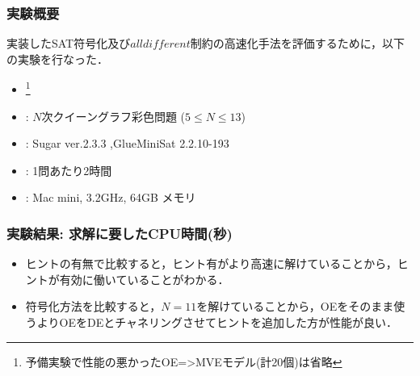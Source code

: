 \documentclass [dvipdfmx,11pt]{beamer}
\newcommand{\alldifferent}{$alldifferent$}
\begin{document}
\begin{frame}
    \frametitle{実験概要}
    実装したSAT符号化及び{\alldifferent}制約の高速化手法を評価するために，以下の実験を行なった．
    \begin{itemize}
        \item {}\footnote{予備実験で性能の悪かったOE={\textgreater}MVEモデル(計20個)は省略}\\
            \vspace{-3mm}
            \begin{block}{}\centering
                {\tiny }
            \end{block}
        \item {}: $N$次クイーングラフ彩色問題 ($5\leq N\leq 13$)
        \item {}: Sugar ver.2.3.3 ,GlueMiniSat 2.2.10-193
        \item {}: 1問あたり2時間
        \item {}: Mac mini, 3.2GHz, 64GB メモリ
    \end{itemize}
\end{frame}



\begin{frame}
    \frametitle{実験結果: 求解に要したCPU時間(秒)}
    \begin{block}{}\centering
        {\tiny }
    \end{block}
    \begin{itemize}
        \item ヒントの有無で比較すると，ヒント有がより高速に解けていることから，ヒントが有効に働いていることがわかる．
        \item 符号化方法を比較すると，$N=11$を解けていることから，OEをそのまま使うよりOEをDEとチャネリングさせてヒントを追加した方が性能が良い．
    \end{itemize}
\end{frame}
\end{document}
